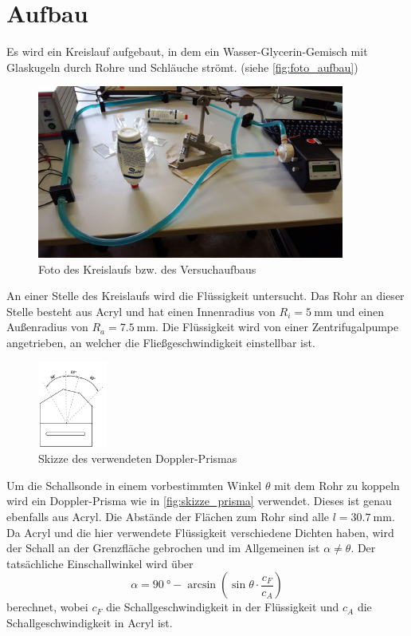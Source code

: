 \section{Aufbau}
\label{sec:Aufbau}

Es wird ein Kreislauf aufgebaut, in dem ein Wasser-Glycerin-Gemisch mit Glaskugeln durch Rohre und Schläuche strömt. (siehe \autoref{fig:foto_aufbau})

\begin{figure}
    \centering
    \includegraphics[width=0.9\textwidth]{images/foto_1.jpg}
    \caption{Foto des Kreislaufs bzw. des Versuchaufbaus}
    \label{fig:foto_aufbau}
\end{figure}

An einer Stelle des Kreislaufs wird die Flüssigkeit untersucht.
Das Rohr an dieser Stelle besteht aus Acryl und hat einen Innenradius von $R_i=\SI{5}{\milli\metre}$ und einen Außenradius von $R_a=\SI{7.5}{\milli\metre}$.
Die Flüssigkeit wird von einer Zentrifugalpumpe angetrieben, an welcher die Fließgeschwindigkeit einstellbar ist.

\begin{figure}
    \centering
    \includegraphics[width=0.2\textwidth]{images/skizze_2.png}
    \caption{Skizze des verwendeten Doppler-Prismas \cite{US3}}
    \label{fig:skizze_prisma}
\end{figure}

Um die Schallsonde in einem vorbestimmten Winkel $\theta$ mit dem Rohr zu koppeln wird ein Doppler-Prisma wie in \autoref{fig:skizze_prisma} verwendet.
Dieses ist genau ebenfalls aus Acryl.
Die Abstände der Flächen zum Rohr sind alle $l=\SI{30.7}{\milli\metre}$.
Da Acryl und die hier verwendete Flüssigkeit verschiedene Dichten haben, wird der Schall an der Grenzfläche gebrochen und im Allgemeinen ist $\alpha \neq \theta$.
Der tatsächliche Einschallwinkel wird über
\begin{equation}
    \alpha = \SI{90}{\degree} - \arcsin \left( \sin \theta \cdot \frac{c_F}{c_A} \right)
    \label{eq:dopplerwinkel}
\end{equation}
berechnet, wobei $c_F$ die Schallgeschwindigkeit in der Flüssigkeit und $c_A$ die Schallgeschwindigkeit in Acryl ist.


